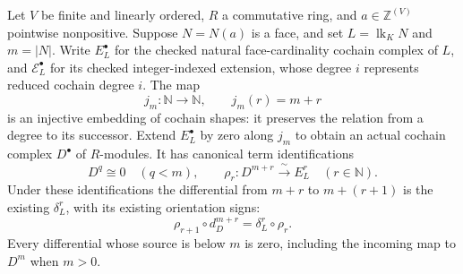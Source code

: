 \begin{lemma}\label{lem:cech-link-cohomology-comparison}
\leanok
Let $V$ be finite and linearly ordered, $R$ a commutative ring, and
$a\in\mathbb Z^{(V)}$ pointwise nonpositive. Suppose $N=N(a)$ is a
face, and set $L=\operatorname{lk}_K N$ and $m=|N|$.
Write $E_L^\bullet$ for the checked natural face-cardinality cochain
complex of $L$, and $\mathcal E_L^\bullet$ for its checked
integer-indexed extension, whose degree $i$ represents reduced cochain
degree $i$. The map
\[
 j_m:\mathbb N\longrightarrow\mathbb N,\qquad j_m(r)=m+r
\]
is an injective embedding of cochain shapes: it preserves the relation
from a degree to its successor. Extend $E_L^\bullet$ by zero along
$j_m$ to obtain an actual cochain complex $D^\bullet$ of $R$-modules.
It has canonical term identifications
\[
 D^q\cong0\quad(q<m),\qquad
 \rho_r:D^{m+r}\xrightarrow{\ \sim\ }E_L^r
       \quad(r\in\mathbb N).
\]
Under these identifications the differential from $m+r$ to $m+(r+1)$
is the existing $\delta_L^r$, with its existing orientation signs:
\[
 \rho_{r+1}\circ d_D^{m+r}=\delta_L^r\circ\rho_r.
\]
Every differential whose source is below $m$ is zero, including the
incoming map to $D^m$ when $m>0$.


\end{lemma}
